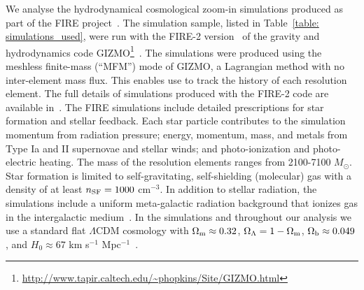 \documentclass[fleqn,usenatbib]{mnras}
\begin{document}
We analyse the hydrodynamical cosmological zoom-in simulations produced as part of the FIRE project~\citep{Hopkins2014}.
The simulation sample, listed in Table~\ref{table: simulations_used}, were run with the FIRE-2 version~\citep{Hopkins2018} of the gravity and hydrodynamics code \textsc{GIZMO}\footnote{\url{http://www.tapir.caltech.edu/\~phopkins/Site/GIZMO.html}}~\citep{Hopkins2015}.
The simulations were produced using the meshless finite-mass (``MFM'') mode of \textsc{GIZMO}, a Lagrangian method with no inter-element mass flux.
This enables use to track the history of each resolution element.
The full details of simulations produced with the FIRE-2 code are available in~\cite{Hopkins2018}.
The FIRE simulations include detailed prescriptions for star formation and stellar feedback.
Each star particle contributes to the simulation momentum from radiation pressure; energy, momentum, mass, and metals from Type Ia and II supernovae and stellar winds; and photo-ionization and photo-electric heating.
The mass of the resolution elements ranges from 2100-7100 $M_\odot$.
Star formation is limited to self-gravitating, self-shielding (molecular) gas with a density of at least $n_{\rm SF} = 1000$ cm$^{-3}$.
In addition to stellar radiation, the simulations include a uniform meta-galactic radiation background that ionizes gas in the intergalactic medium~\citep{Faucher-Giguere2009}.
In the simulations and throughout our analysis we use a standard flat $\Lambda$CDM cosmology with $\Omega_{\rm m }\approx 0.32$, $\Omega_{\Lambda}=1-\Omega_{\rm m}$, $\Omega_{\rm b} \approx 0.049$, and $H_{0} \approx 67$ km s$^{-1}$ Mpc$^{-1}$~\citep[e.g.,][]{PlanckCollaboration2018}.
\end{document}
